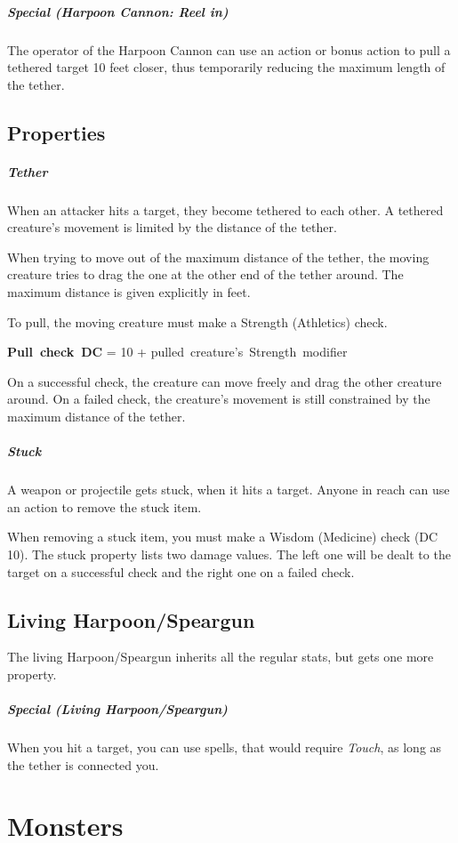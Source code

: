 \documentclass[letterpaper,twocolumn,openany,nodeprecatedcode]{dndbook}
\begin{document}
\subparagraph{Special (Harpoon Cannon: Reel in)}
The operator of the Harpoon Cannon can use an action or bonus action to pull a tethered target 10 feet closer, thus temporarily reducing the maximum length of the tether.

\subsection{Properties}

\subparagraph{Tether}
When an attacker hits a target, they become tethered to each other.
A tethered creature's movement is limited by the distance of the tether.

When trying to move out of the maximum distance of the tether, the moving creature tries to drag the one at the other end of the tether around.
The maximum distance is given explicitly in feet.

To pull, the moving creature must make a Strength (Athletics) check.

\begin{center}
    \mbox{\bf Pull check DC} = \mbox{10} + \mbox{pulled creature's Strength modifier}
\end{center}

On a successful check, the creature can move freely and drag the other creature around.
On a failed check, the creature's movement is still constrained by the maximum distance of the tether.

\subparagraph{Stuck}
A weapon or projectile gets stuck, when it hits a target.
Anyone in reach can use an action to remove the stuck item.

When removing a stuck item, you must make a Wisdom (Medicine) check (DC 10). 
The stuck property lists two damage values.
The left one will be dealt to the target on a successful check and the right one on a failed check.

\subsection{Living Harpoon/Speargun}
The living Harpoon/Speargun inherits all the regular stats, but gets one more property.

\subparagraph{Special (Living Harpoon/Speargun)}
When you hit a target, you can use spells, that would require \emph{Touch}, as long as the tether is connected you.

\section{Monsters}
\end{document}
